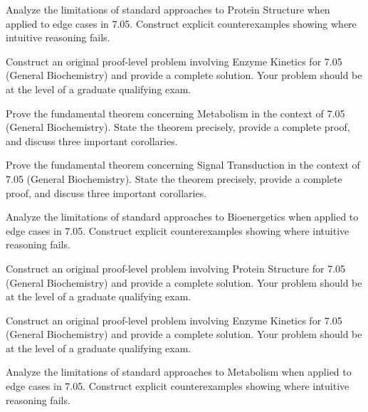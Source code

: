 \documentclass[12pt,a4paper]{exam}
\begin{document}
\begin{questions}

\question[4]
Analyze the limitations of standard approaches to Protein Structure when applied to edge cases in 7.05. Construct explicit counterexamples showing where intuitive reasoning fails.

\vspace{0.3cm}

\question[3]
Construct an original proof-level problem involving Enzyme Kinetics for 7.05 (General Biochemistry) and provide a complete solution. Your problem should be at the level of a graduate qualifying exam.

\vspace{0.3cm}

\question[4]
Prove the fundamental theorem concerning Metabolism in the context of 7.05 (General Biochemistry). State the theorem precisely, provide a complete proof, and discuss three important corollaries.

\vspace{0.3cm}

\question[5]
Prove the fundamental theorem concerning Signal Transduction in the context of 7.05 (General Biochemistry). State the theorem precisely, provide a complete proof, and discuss three important corollaries.

\vspace{0.3cm}

\question[4]
Analyze the limitations of standard approaches to Bioenergetics when applied to edge cases in 7.05. Construct explicit counterexamples showing where intuitive reasoning fails.

\vspace{0.3cm}

\question[4]
Construct an original proof-level problem involving Protein Structure for 7.05 (General Biochemistry) and provide a complete solution. Your problem should be at the level of a graduate qualifying exam.

\vspace{0.3cm}

\question[5]
Construct an original proof-level problem involving Enzyme Kinetics for 7.05 (General Biochemistry) and provide a complete solution. Your problem should be at the level of a graduate qualifying exam.

\vspace{0.3cm}

\question[9]
Analyze the limitations of standard approaches to Metabolism when applied to edge cases in 7.05. Construct explicit counterexamples showing where intuitive reasoning fails.


\end{questions}
\end{document}
